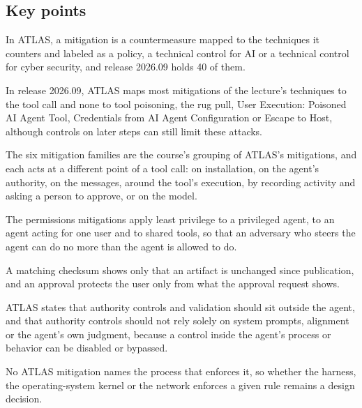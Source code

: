 \subsection*{Key points}
\bi
\item In ATLAS, a mitigation is a countermeasure mapped to the techniques it counters and labeled
as a policy, a technical control for AI or a technical control for cyber security, and release
2026.09 holds 40 of them.
\item In release 2026.09, ATLAS maps most mitigations of the lecture's techniques to the tool call
and none to tool poisoning, the rug pull, User Execution: Poisoned AI Agent Tool, Credentials from AI
Agent Configuration or Escape to Host, although controls on later steps can still limit these
attacks.
\item The six mitigation families are the course's grouping of ATLAS's mitigations, and each acts
at a different point of a tool call: on installation, on the agent's authority, on the messages,
around the tool's execution, by recording activity and asking a person to approve, or on the model.
\item The permissions mitigations apply least privilege to a privileged agent, to an agent acting
for one user and to shared tools, so that an adversary who steers the agent can do no more than the
agent is allowed to do.
\item A matching checksum shows only that an artifact is unchanged since publication, and an
approval protects the user only from what the approval request shows.
\item ATLAS states that authority controls and validation should sit outside the agent, and that
authority controls should not rely solely on system prompts, alignment or the agent's own judgment,
because a control inside the agent's process or behavior can be disabled or bypassed.
\item No ATLAS mitigation names the process that enforces it, so whether the harness, the
operating-system kernel or the network enforces a given rule remains a design decision.
\ei
